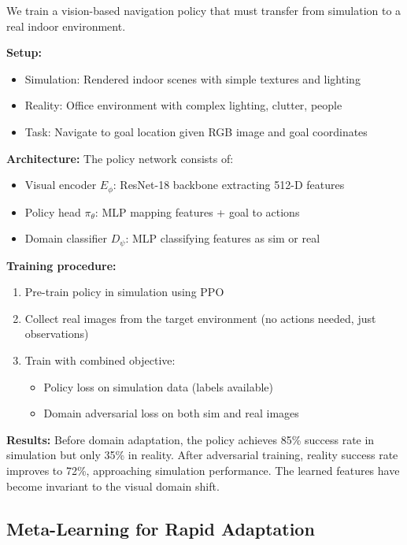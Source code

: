 \begin{example}
\label{ex:adversarial_visual_adaptation}
We train a vision-based navigation policy that must transfer from simulation to a real indoor environment.

\textbf{Setup:}
\begin{itemize}
    \item Simulation: Rendered indoor scenes with simple textures and lighting
    \item Reality: Office environment with complex lighting, clutter, people
    \item Task: Navigate to goal location given RGB image and goal coordinates
\end{itemize}

\textbf{Architecture:}
The policy network consists of:
\begin{itemize}
    \item Visual encoder $E_\phi$: ResNet-18 backbone extracting 512-D features
    \item Policy head $\pi_\theta$: MLP mapping features + goal to actions
    \item Domain classifier $D_\psi$: MLP classifying features as sim or real
\end{itemize}

\textbf{Training procedure:}
\begin{enumerate}
    \item Pre-train policy in simulation using PPO
    \item Collect real images from the target environment (no actions needed, just observations)
    \item Train with combined objective:
    \begin{itemize}
        \item Policy loss on simulation data (labels available)
        \item Domain adversarial loss on both sim and real images
    \end{itemize}
\end{enumerate}

\textbf{Results:}
Before domain adaptation, the policy achieves 85\% success rate in simulation but only 35\% in reality. After adversarial training, reality success rate improves to 72\%, approaching simulation performance. The learned features have become invariant to the visual domain shift.
\end{example}

\subsection{Meta-Learning for Rapid Adaptation}

